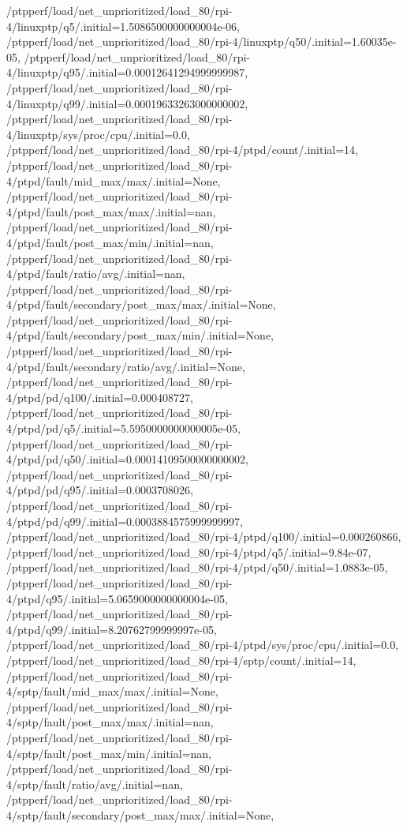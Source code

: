 {    /ptpperf/load/net_unprioritized/load_80/rpi-4/linuxptp/q5/.initial=1.5086500000000004e-06,
    /ptpperf/load/net_unprioritized/load_80/rpi-4/linuxptp/q50/.initial=1.60035e-05,
    /ptpperf/load/net_unprioritized/load_80/rpi-4/linuxptp/q95/.initial=0.00012641294999999987,
    /ptpperf/load/net_unprioritized/load_80/rpi-4/linuxptp/q99/.initial=0.00019633263000000002,
    /ptpperf/load/net_unprioritized/load_80/rpi-4/linuxptp/sys/proc/cpu/.initial=0.0,
    /ptpperf/load/net_unprioritized/load_80/rpi-4/ptpd/count/.initial=14,
    /ptpperf/load/net_unprioritized/load_80/rpi-4/ptpd/fault/mid_max/max/.initial=None,
    /ptpperf/load/net_unprioritized/load_80/rpi-4/ptpd/fault/post_max/max/.initial=nan,
    /ptpperf/load/net_unprioritized/load_80/rpi-4/ptpd/fault/post_max/min/.initial=nan,
    /ptpperf/load/net_unprioritized/load_80/rpi-4/ptpd/fault/ratio/avg/.initial=nan,
    /ptpperf/load/net_unprioritized/load_80/rpi-4/ptpd/fault/secondary/post_max/max/.initial=None,
    /ptpperf/load/net_unprioritized/load_80/rpi-4/ptpd/fault/secondary/post_max/min/.initial=None,
    /ptpperf/load/net_unprioritized/load_80/rpi-4/ptpd/fault/secondary/ratio/avg/.initial=None,
    /ptpperf/load/net_unprioritized/load_80/rpi-4/ptpd/pd/q100/.initial=0.000408727,
    /ptpperf/load/net_unprioritized/load_80/rpi-4/ptpd/pd/q5/.initial=5.5950000000000005e-05,
    /ptpperf/load/net_unprioritized/load_80/rpi-4/ptpd/pd/q50/.initial=0.00014109500000000002,
    /ptpperf/load/net_unprioritized/load_80/rpi-4/ptpd/pd/q95/.initial=0.0003708026,
    /ptpperf/load/net_unprioritized/load_80/rpi-4/ptpd/pd/q99/.initial=0.0003884575999999997,
    /ptpperf/load/net_unprioritized/load_80/rpi-4/ptpd/q100/.initial=0.000260866,
    /ptpperf/load/net_unprioritized/load_80/rpi-4/ptpd/q5/.initial=9.84e-07,
    /ptpperf/load/net_unprioritized/load_80/rpi-4/ptpd/q50/.initial=1.0883e-05,
    /ptpperf/load/net_unprioritized/load_80/rpi-4/ptpd/q95/.initial=5.0659000000000004e-05,
    /ptpperf/load/net_unprioritized/load_80/rpi-4/ptpd/q99/.initial=8.20762799999997e-05,
    /ptpperf/load/net_unprioritized/load_80/rpi-4/ptpd/sys/proc/cpu/.initial=0.0,
    /ptpperf/load/net_unprioritized/load_80/rpi-4/sptp/count/.initial=14,
    /ptpperf/load/net_unprioritized/load_80/rpi-4/sptp/fault/mid_max/max/.initial=None,
    /ptpperf/load/net_unprioritized/load_80/rpi-4/sptp/fault/post_max/max/.initial=nan,
    /ptpperf/load/net_unprioritized/load_80/rpi-4/sptp/fault/post_max/min/.initial=nan,
    /ptpperf/load/net_unprioritized/load_80/rpi-4/sptp/fault/ratio/avg/.initial=nan,
    /ptpperf/load/net_unprioritized/load_80/rpi-4/sptp/fault/secondary/post_max/max/.initial=None,
}

